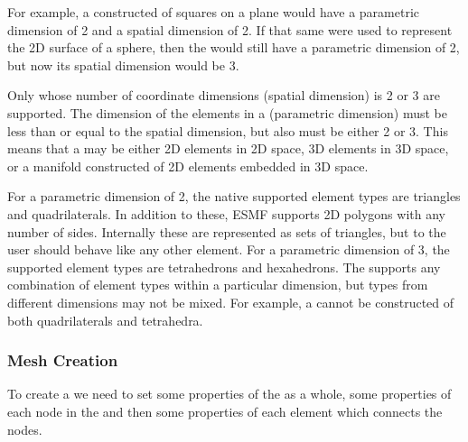 \documentclass[letterpaper,10pt,english]{sphinxmanual}
\begin{document}
For example, a {\hyperref[\detokenize{mesh:ESMF.api.mesh.Mesh}]{}} constructed of squares on a plane would have a parametric
dimension of 2 and a spatial dimension of 2. If that same {\hyperref[\detokenize{mesh:ESMF.api.mesh.Mesh}]{}} were used to
represent the 2D surface of a sphere, then the {\hyperref[\detokenize{mesh:ESMF.api.mesh.Mesh}]{}} would still have a
parametric dimension of 2, but now its spatial dimension would be 3.

Only {\hyperref[\detokenize{mesh:ESMF.api.mesh.Mesh}]{}} whose number of coordinate dimensions (spatial dimension) is 2 or 3
are supported. The dimension of the elements in a {\hyperref[\detokenize{mesh:ESMF.api.mesh.Mesh}]{}} (parametric dimension) must
be less than or equal to the spatial dimension, but also must be either 2 or 3.
This means that a {\hyperref[\detokenize{mesh:ESMF.api.mesh.Mesh}]{}} may be either 2D elements in 2D space, 3D elements in 3D
space, or a manifold constructed of 2D elements embedded in 3D space.

For a parametric dimension of 2, the native supported element types are
triangles and quadrilaterals. In addition to these, ESMF supports 2D polygons
with any number of sides. Internally these are represented as sets of triangles,
but to the user should behave like any other element. For a parametric dimension
of 3, the supported element types are tetrahedrons and hexahedrons. The {\hyperref[\detokenize{mesh:ESMF.api.mesh.Mesh}]{}}
supports any combination of element types within a particular dimension, but
types from different dimensions may not be mixed. For example, a {\hyperref[\detokenize{mesh:ESMF.api.mesh.Mesh}]{}} cannot be
constructed of both quadrilaterals and tetrahedra.


\subsubsection{Mesh Creation}
\label{\detokenize{api:mesh-creation}}
To create a {\hyperref[\detokenize{mesh:ESMF.api.mesh.Mesh}]{}} we need to set some properties of the {\hyperref[\detokenize{mesh:ESMF.api.mesh.Mesh}]{}} as a whole, some
properties of each node in the {\hyperref[\detokenize{mesh:ESMF.api.mesh.Mesh}]{}} and then some properties of each element
which connects the nodes.
\end{document}
